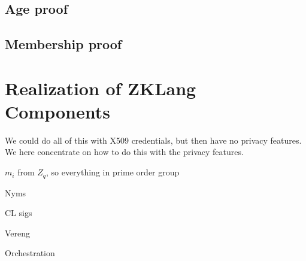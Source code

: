 \subsection{Age proof}


\subsection{Membership proof}



\section{Realization of ZKLang Components}
We could do all of this with X509 credentials, but then have no privacy features. 
We here concentrate on how to do this with the privacy features.


$m_i$ from $Z_q$, so everything in prime order group

Nyms

CL sigs

Vereng

Orchestration
